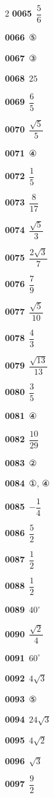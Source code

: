 \documentclass[10pt,a4paper]{article}
\begin{document}
\begin{multicols}{2}
\noindent\textbf{0065}\ $\dfrac{5}{6}$\par
\noindent\textbf{0066}\ ⑤\par
\noindent\textbf{0067}\ ③\par
\noindent\textbf{0068}\ $25$\par
\noindent\textbf{0069}\ $\dfrac{6}{5}$\par
\noindent\textbf{0070}\ $\dfrac{\sqrt{5}}{5}$\par
\noindent\textbf{0071}\ ④\par
\noindent\textbf{0072}\ $\dfrac{1}{5}$\par
\noindent\textbf{0073}\ $\dfrac{8}{17}$\par
\noindent\textbf{0074}\ $\dfrac{\sqrt{5}}{3}$\par
\noindent\textbf{0075}\ $\dfrac{2\sqrt{3}}{7}$\par
\noindent\textbf{0076}\ $\dfrac{7}{9}$\par
\noindent\textbf{0077}\ $\dfrac{\sqrt{5}}{10}$\par
\noindent\textbf{0078}\ $\dfrac{4}{3}$\par
\noindent\textbf{0079}\ $\dfrac{\sqrt{13}}{13}$\par
\noindent\textbf{0080}\ $\dfrac{3}{5}$\par
\noindent\textbf{0081}\ ④\par
\noindent\textbf{0082}\ $\dfrac{10}{29}$\par
\noindent\textbf{0083}\ ②\par
\noindent\textbf{0084}\ ①, ④\par
\noindent\textbf{0085}\ $-\dfrac{1}{4}$\par
\noindent\textbf{0086}\ $\dfrac{5}{2}$\par
\noindent\textbf{0087}\ $\dfrac{1}{2}$\par
\noindent\textbf{0088}\ $\dfrac{1}{2}$\par
\noindent\textbf{0089}\ $40^\circ$\par
\noindent\textbf{0090}\ $\dfrac{\sqrt{2}}{4}$\par
\noindent\textbf{0091}\ $60^\circ$\par
\noindent\textbf{0092}\ $4\sqrt{3}$\par
\noindent\textbf{0093}\ ⑤\par
\noindent\textbf{0094}\ $24\sqrt{3}$\par
\noindent\textbf{0095}\ $4\sqrt{2}$\par
\noindent\textbf{0096}\ $\sqrt{3}$\par
\noindent\textbf{0097}\ $\dfrac{9}{2}$\par

\end{multicols}
\end{document}
